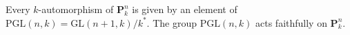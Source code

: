 Every $k$-automorphism of $\mathbf{P}_k^n$ is given by an element of $\text{PGL}(n,k) = \text{GL}(n+1,k)/k^*$. The group $\text{PGL}(n,k)$ acts faithfully on $\mathbf{P}_k^n$.
